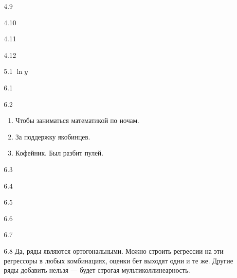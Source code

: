 \protect \hypertarget {soln:4.9}{}
\begin{solution}{{4.9}}
\end{solution}
\protect \hypertarget {soln:4.10}{}
\begin{solution}{{4.10}}
\end{solution}
\protect \hypertarget {soln:4.11}{}
\begin{solution}{{4.11}}
\end{solution}
\protect \hypertarget {soln:4.12}{}
\begin{solution}{{4.12}}
\end{solution}
\protect \hypertarget {soln:5.1}{}
\begin{solution}{{5.1}}
  $\ln y$
\end{solution}
\protect \hypertarget {soln:6.1}{}
\begin{solution}{{6.1}}
\end{solution}
\protect \hypertarget {soln:6.2}{}
\begin{solution}{{6.2}}
    \begin{enumerate}
      \item Чтобы заниматься математикой по ночам.
      \item За поддержку якобинцев.
      \item Кофейник. Был разбит пулей.
    \end{enumerate}
\end{solution}
\protect \hypertarget {soln:6.3}{}
\begin{solution}{{6.3}}
  
\end{solution}
\protect \hypertarget {soln:6.4}{}
\begin{solution}{{6.4}}
  
\end{solution}
\protect \hypertarget {soln:6.5}{}
\begin{solution}{{6.5}}
  
\end{solution}
\protect \hypertarget {soln:6.6}{}
\begin{solution}{{6.6}}
  
\end{solution}
\protect \hypertarget {soln:6.7}{}
\begin{solution}{{6.7}}
  
\end{solution}
\protect \hypertarget {soln:6.8}{}
\begin{solution}{{6.8}}
   Да, ряды являются ортогональными. Можно строить регрессии на эти регрессоры в любых комбинациях, оценки бет выходят одни и те же.
   Другие ряды добавить нельзя — будет строгая мультиколлинеарность.
 
\end{solution}
